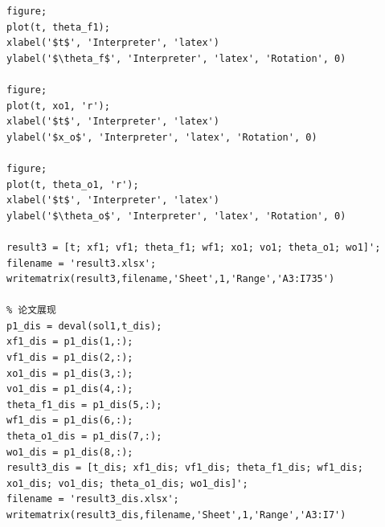\documentclass{my_paper}
\begin{document}
\begin{lstlisting}
figure;
plot(t, theta_f1);
xlabel('$t$', 'Interpreter', 'latex')
ylabel('$\theta_f$', 'Interpreter', 'latex', 'Rotation', 0)

figure;
plot(t, xo1, 'r');
xlabel('$t$', 'Interpreter', 'latex')
ylabel('$x_o$', 'Interpreter', 'latex', 'Rotation', 0)

figure;
plot(t, theta_o1, 'r');
xlabel('$t$', 'Interpreter', 'latex')
ylabel('$\theta_o$', 'Interpreter', 'latex', 'Rotation', 0)

result3 = [t; xf1; vf1; theta_f1; wf1; xo1; vo1; theta_o1; wo1]';
filename = 'result3.xlsx';
writematrix(result3,filename,'Sheet',1,'Range','A3:I735')

% 论文展现
p1_dis = deval(sol1,t_dis);
xf1_dis = p1_dis(1,:);
vf1_dis = p1_dis(2,:);
xo1_dis = p1_dis(3,:);
vo1_dis = p1_dis(4,:);
theta_f1_dis = p1_dis(5,:);
wf1_dis = p1_dis(6,:);
theta_o1_dis = p1_dis(7,:);
wo1_dis = p1_dis(8,:);
result3_dis = [t_dis; xf1_dis; vf1_dis; theta_f1_dis; wf1_dis; xo1_dis; vo1_dis; theta_o1_dis; wo1_dis]';
filename = 'result3_dis.xlsx';
writematrix(result3_dis,filename,'Sheet',1,'Range','A3:I7')
\end{lstlisting}
\end{document}
